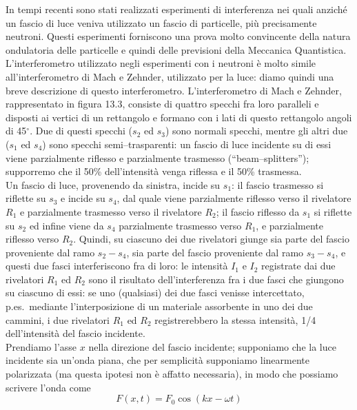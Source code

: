 In tempi recenti sono stati realizzati esperimenti di interferenza nei quali
anzich\'e un fascio di luce veniva utilizzato un fascio di particelle, pi\`u
precisamente neutroni. Questi esperimenti forniscono una prova molto convincente
della natura ondulatoria delle particelle e quindi delle previsioni della
Meccanica Quantistica.\\
L'interferometro utilizzato negli esperimenti con i neutroni \`e molto simile
all'interferometro di Mach e Zehnder, utilizzato per la luce: diamo quindi una
breve descrizione di questo interferometro.
L'interferometro di Mach e Zehnder, rappresentato in figura 13.3, consiste di
quattro specchi fra loro paralleli e disposti ai vertici di un rettangolo e
formano con i lati di questo rettangolo angoli di 45$^\circ$. Due di questi
specchi ($s_2$ ed $s_3$) sono normali specchi, mentre gli altri due ($s_1$ ed
$s_4$) sono specchi semi--trasparenti: un fascio di luce incidente su di essi
viene parzialmente riflesso e parzialmente trasmesso (``beam--splitters'');
supporremo che il 50\% dell'intensit\`a venga riflessa e il 50\% trasmessa.\\
Un fascio di luce, provenendo da sinistra, incide su $s_1$: il fascio trasmesso
si riflette su $s_3$ e incide su $s_4$, dal quale viene parzialmente riflesso
verso il rivelatore $R_1$ e parzialmente trasmesso verso il rivelatore $R_2$; il
fascio riflesso da $s_1$ si riflette su $s_2$ ed infine
viene da $s_4$ parzialmente trasmesso verso $R_1$, e parzialmente riflesso verso
$R_2$. Quindi, su ciascuno dei due rivelatori giunge sia parte del fascio
proveniente dal ramo $s_2-s_4$, sia parte del fascio proveniente dal ramo
$s_3-s_4$, e questi due fasci interferiscono fra di loro: le intensit\`a $I_1$ e
$I_2$ registrate dai due rivelatori $R_1$ ed $R_2$ sono il risultato
dell'interferenza fra i due fasci che giungono su ciascuno di essi: se uno
(qualsiasi) dei due fasci venisse intercettato, p.es.\ mediante l'interposizione
di un materiale assorbente in uno dei due cammini, i due rivelatori $R_1$ ed
$R_2$ registrerebbero la stessa intensit\`a, 1/4 dell'intensit\`a del fascio
incidente.\\
Prendiamo l'asse $x$ nella direzione del fascio incidente; supponiamo che la
luce incidente sia un'onda piana, che per semplicit\`a supponiamo linearmente
polarizzata (ma questa ipotesi non \`e affatto necessaria), in modo che possiamo
scrivere l'onda come
\begin{equation}
  F(x,t)=F_0\cos(kx-\omega t)
  \tag{13.18}
\end{equation}
